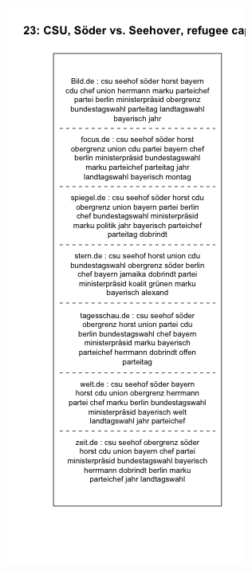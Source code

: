 \documentclass[12pt,a4paper,notitlepage]{article}
\begin{document}
\begin{figure}[H]
\begin{center}
\begin{subfigure}[normla]{0.49\textwidth}
		\end{subfigure}
		\begin{subfigure}[normla]{0.49\textwidth}
			\includegraphics[width=\textwidth]{../figs/plotquote23.png}
		\end{subfigure}
	\end{center}
\end{figure}
\end{document}

